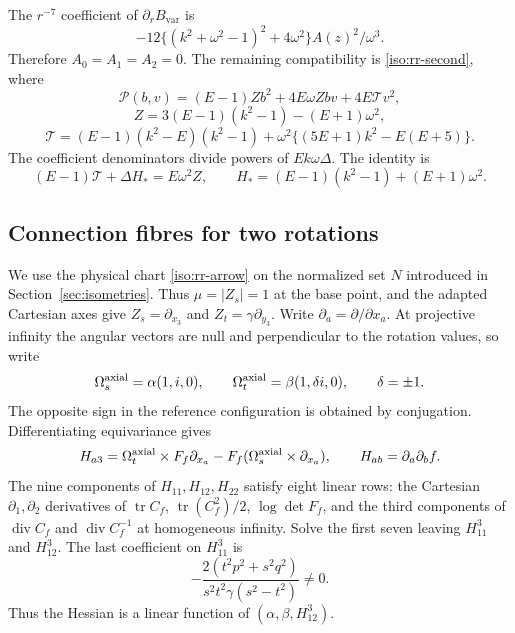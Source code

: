 \documentclass[11pt,a4paper]{article}
\numberwithin{equation}{section}
\theoremstyle{plain}
\theoremstyle{definition}
\theoremstyle{remark}
\begin{document}
  The $r^{-7}$ coefficient of $\partial_rB_{\mathrm{var}}$ is
\[
 -12\{(k^2+\omega^2-1)^2+4\omega^2\}A(z)^2/\omega^3.
\]
Therefore $A_0=A_1=A_2=0$. The remaining compatibility is \eqref{iso:rr-second}, where
\[
 \mathscr P(b,v)=(E-1)Zb^2+4E\omega Zbv+4E\mathscr Tv^2,
\]
\[
 Z=3(E-1)(k^2-1)-(E+1)\omega^2,
\]
\[
 \mathscr T=(E-1)(k^2-E)(k^2-1)
           +\omega^2\{(5E+1)k^2-E(E+5)\}.
\]
The coefficient denominators divide powers of $Ek\omega\Delta$.
The identity is
\begin{equation}\label{appiso-conic-wall}
 (E-1)\mathscr T+\Delta H_*=E\omega^2Z,\qquad
 H_*=(E-1)(k^2-1)+(E+1)\omega^2.
\end{equation}

\subsection{Connection fibres for two rotations}
\label{appiso-rr-matrix}
We use the physical chart \eqref{iso:rr-arrow} on the normalized set
$N$ introduced in Section~\ref{sec:isometries}. Thus $\mu=|Z_s|=1$ at the base point, and the
adapted Cartesian axes give $Z_s=\partial_{x_3}$ and
$Z_t=\gamma\partial_{y_3}$. Write $\partial_a=\partial/\partial x_a$.
At projective infinity the angular vectors are null and perpendicular
to the rotation values, so write
\[
 \Omega_s^{\rm axial}=\alpha(1,i,0),\qquad \Omega_t^{\rm axial}=\beta(1,\delta i,0),\qquad \delta=\pm1.
\]
The opposite sign in the reference configuration is obtained by conjugation. Differentiating equivariance gives
\begin{equation}\label{iso:rr-H}
 H_{a3}=\Omega_t^{\rm axial}\times F_f\partial_{x_a}-F_f(\Omega_s^{\rm axial}\times \partial_{x_a}),\qquad H_{ab}=\partial_a\partial_b f.
\end{equation}
The nine components of $H_{11},H_{12},H_{22}$ satisfy eight linear rows:
the Cartesian $\partial_1,\partial_2$ derivatives of $\operatorname{tr}C_f$,
$\operatorname{tr}(C_f^2)/2$, $\log\det F_f$, and the third components of
$\operatorname{div}C_f$ and $\operatorname{div}C_f^{-1}$ at homogeneous
infinity.  Solve the first seven leaving $H_{11}^3$ and $H_{12}^3$.
The last coefficient on $H_{11}^3$ is
\[
 -\frac{2(t^2p^2+s^2q^2)}{s^2t^2\gamma(s^2-t^2)}\ne0.
\]
Thus the Hessian is a linear function of $(\alpha,\beta,H_{12}^3)$.
\end{document}
